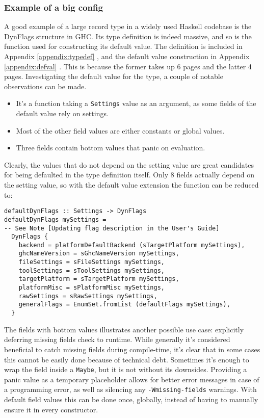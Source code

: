 \documentclass[en]{pracamgr}
\newcommand{\code}[1]{\lstinline[breaklines=true]{#1}}
\begin{document}
\subsubsection{Example of a big config}
A good example of a large record type in a widely used Haskell codebase is the DynFlags structure in GHC.
Its type definition is indeed massive, and so is the function used for constructing its default value.
The definition is included in Appendix \ref{appendix:typedef} \cite{GHCDynFlagsDefinition}, and the default value construction in Appendix \ref{appendix:defval} \cite{GHCDynFlagsDefault}.
This is because the former takes up 6 pages and the latter 4 pages.
Investigating the default value for the type, a couple of notable observations can be made.
\begin{itemize}
  \item It's a function taking a \code{Settings} value as an argument, as some fields of the default value rely on settings.
  \item Most of the other field values are either constants or global values.
  \item Three fields contain bottom values that panic on evaluation.
\end{itemize}
Clearly, the values that do not depend on the setting value are great candidates for being defaulted in the type definition itself.
Only 8 fields actually depend on the setting value, so with the default value extension the function can be reduced to:
\begin{lstlisting}
defaultDynFlags :: Settings -> DynFlags
defaultDynFlags mySettings =
-- See Note [Updating flag description in the User's Guide]
  DynFlags {
    backend = platformDefaultBackend (sTargetPlatform mySettings),
    ghcNameVersion = sGhcNameVersion mySettings,
    fileSettings = sFileSettings mySettings,
    toolSettings = sToolSettings mySettings,
    targetPlatform = sTargetPlatform mySettings,
    platformMisc = sPlatformMisc mySettings,
    rawSettings = sRawSettings mySettings,
    generalFlags = EnumSet.fromList (defaultFlags mySettings),
  }
\end{lstlisting}
The fields with bottom values illustrates another possible use case: explicitly deferring missing fields check to runtime.
While generally it's considered beneficial to catch missing fields during compile-time, it's clear that in some cases this cannot be easily done
because of technical debt. Sometimes it's enough to wrap the field inside a \code{Maybe}, but it is not without its downsides.
Providing a panic value as a temporary placeholder allows for better error messages in case of a programming error, as well as silencing any 
\code{-Wmissing-fields} warnings. With default field values this can be done once, globally, instead of having to manually ensure it in every constructor.
\end{document}

